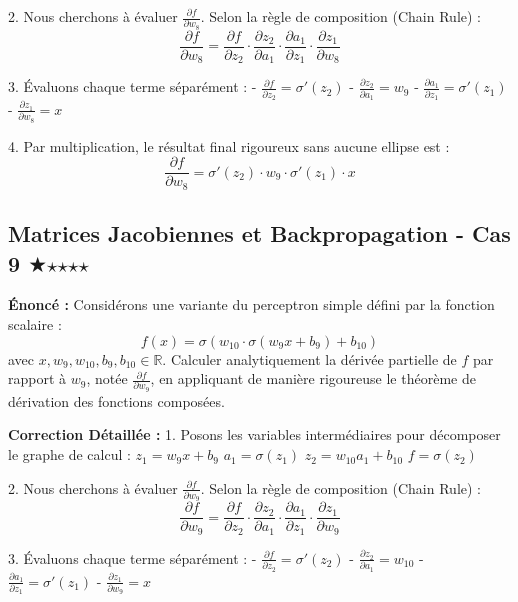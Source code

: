 \documentclass[11pt,a4paper]{article}
\begin{document}
2. Nous cherchons à évaluer $\frac{{\partial f}}{{\partial w_{8}}}$. Selon la règle de composition (Chain Rule) :
   $$ \frac{{\partial f}}{{\partial w_{8}}} = \frac{{\partial f}}{{\partial z_2}} \cdot \frac{{\partial z_2}}{{\partial a_1}} \cdot \frac{{\partial a_1}}{{\partial z_1}} \cdot \frac{{\partial z_1}}{{\partial w_{8}}} $$

3. Évaluons chaque terme séparément :
   - $\frac{{\partial f}}{{\partial z_2}} = \sigma'(z_2)$
   - $\frac{{\partial z_2}}{{\partial a_1}} = w_{9}$
   - $\frac{{\partial a_1}}{{\partial z_1}} = \sigma'(z_1)$
   - $\frac{{\partial z_1}}{{\partial w_{8}}} = x$

4. Par multiplication, le résultat final rigoureux sans aucune ellipse est :
   $$ \frac{{\partial f}}{{\partial w_{8}}} = \sigma'(z_2) \cdot w_{9} \cdot \sigma'(z_1) \cdot x $$

\vspace{1cm}

\subsection*{Matrices Jacobiennes et Backpropagation - Cas 9 $\bigstar$$\star$$\star$$\star$$\star$}

\textbf{Énoncé :}
Considérons une variante du perceptron simple défini par la fonction scalaire :
$$ f(x) = \sigma(w_{10} \cdot \sigma(w_{9} x + b_{9}) + b_{10}) $$
avec $x, w_{9}, w_{10}, b_{9}, b_{10} \in \mathbb{R}$.
Calculer analytiquement la dérivée partielle de $f$ par rapport à $w_{9}$, notée $\frac{{\partial f}}{{\partial w_{9}}}$, en appliquant de manière rigoureuse le théorème de dérivation des fonctions composées.

\textbf{Correction Détaillée :}
1. Posons les variables intermédiaires pour décomposer le graphe de calcul :
   $z_1 = w_{9} x + b_{9}$
   $a_1 = \sigma(z_1)$
   $z_2 = w_{10} a_1 + b_{10}$
   $f = \sigma(z_2)$

2. Nous cherchons à évaluer $\frac{{\partial f}}{{\partial w_{9}}}$. Selon la règle de composition (Chain Rule) :
   $$ \frac{{\partial f}}{{\partial w_{9}}} = \frac{{\partial f}}{{\partial z_2}} \cdot \frac{{\partial z_2}}{{\partial a_1}} \cdot \frac{{\partial a_1}}{{\partial z_1}} \cdot \frac{{\partial z_1}}{{\partial w_{9}}} $$

3. Évaluons chaque terme séparément :
   - $\frac{{\partial f}}{{\partial z_2}} = \sigma'(z_2)$
   - $\frac{{\partial z_2}}{{\partial a_1}} = w_{10}$
   - $\frac{{\partial a_1}}{{\partial z_1}} = \sigma'(z_1)$
   - $\frac{{\partial z_1}}{{\partial w_{9}}} = x$
\end{document}
